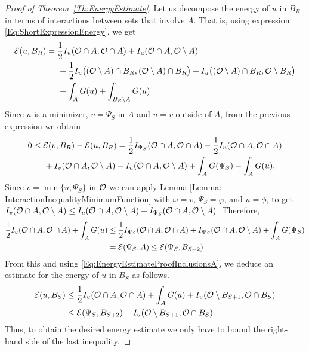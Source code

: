 \begin{proof}[Proof of Theorem~\ref{Th:EnergyEstimate}]
Let us decompose the energy of $u$ in $B_R$ in terms of interactions between sets that involve $A$. That is, using expression \eqref{Eq:ShortExpressionEnergy}, we get
\begin{align*}
\mathcal{E}(u,B_R) &= \frac{1}{2}I_u(\mathcal{O} \cap A, \mathcal{O} \cap A) + I_u(\mathcal{O} \cap A, \mathcal{O} \setminus A) \\
& \hspace{5mm} + \frac{1}{2}I_u\big((\mathcal{O} \setminus A) \cap B_R, (\mathcal{O} \setminus A) \cap B_R\big) + I_u\big((\mathcal{O} \setminus A) \cap B_R, \mathcal{O} \setminus B_R\big) \\
& \hspace{5mm} + \int_A G(u) + \int_{B_R\setminus A} G(u)
\end{align*}
Since $u$ is a minimizer, $v=\Psi_S$ in $A$ and $u=v$ outside of $A$,  from the previous expression we obtain
\begin{align*}
0 &\leq \mathcal{E}(v,B_R)-\mathcal{E}(u,B_R) = \frac{1}{2}I_{\Psi_S}(\mathcal{O} \cap A, \mathcal{O} \cap A) - \frac{1}{2}I_u(\mathcal{O} \cap A, \mathcal{O} \cap A)\\
& \hspace{5mm} + I_v(\mathcal{O} \cap A, \mathcal{O} \setminus A) - I_u(\mathcal{O} \cap A, \mathcal{O} \setminus A) + \int_A G(\Psi_S) - \int_{A} G(u).
\end{align*}
Since $v = \min\{u,\Psi_S\}$ in $\mathcal{O}$ we can apply Lemma \ref{Lemma: InteractionInequalityMinimumFunction} with $\omega = v$, $\Psi_S = \varphi$, and $u= \phi$, to get $I_v(\mathcal{O} \cap A, \mathcal{O}\setminus A) \leq I_u(\mathcal{O} \cap A, \mathcal{O}\setminus A) + I_{\Psi_S}(\mathcal{O} \cap A, \mathcal{O}\setminus A)$. Therefore,
\begin{align*}
\frac{1}{2}I_u(\mathcal{O} \cap A, \mathcal{O} \cap A) + \int_{A} G(u) &\leq \frac{1}{2}I_{\Psi_S}(\mathcal{O} \cap A, \mathcal{O} \cap A) + I_{\Psi_S}(\mathcal{O} \cap A, \mathcal{O} \setminus A) + \int_A G(\Psi_S)  \\
&= \mathcal{E}(\Psi_S, A) \leq \mathcal{E}(\Psi_S,B_{S+2})
\end{align*}
From this and using \eqref{Eq:EnergyEstimateProofInclusionsA}, we deduce an estimate for the energy of $u$ in $B_S$ as follows.
\begin{align*}
\mathcal{E}(u,B_S) &\leq \frac{1}{2}I_u(\mathcal{O} \cap A, \mathcal{O} \cap A) + \int_{A} G(u) + I_u(\mathcal{O} \setminus B_{S+1}, \mathcal{O} \cap B_S) \\
& \leq  \mathcal{E}(\Psi_S,B_{S+2}) + I_u(\mathcal{O} \setminus B_{S+1}, \mathcal{O} \cap B_S).
\end{align*}
Thus, to obtain the desired energy estimate we only have to bound the right-hand side of the last inequality.



\end{proof}
